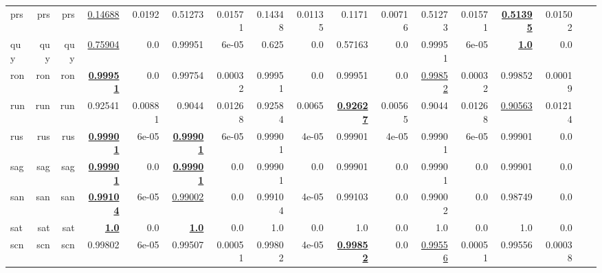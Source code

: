 \documentclass[11pt]{article}
\begin{document}
\begin{table*}[h]
{\begin{tabular}{lrrrrrrrrrrrrrrrr}
prs         & prs         & prs         & \underline{0.14688}         & 0.0192         & 0.51273         & 0.01571         & 0.14348         & 0.01135         & 0.1171         & 0.00716         & 0.51273         & 0.01571         & \textbf{\underline{0.51395}}         & 0.01502         \\
quy         & quy         & quy         & \underline{0.75904}         & 0.0         & 0.99951         & 6e-05         & 0.625         & 0.0         & 0.57163         & 0.0         & 0.99951         & 6e-05         & \textbf{\underline{1.0}}         & 0.0         \\
ron         & ron         & ron         & \textbf{\underline{0.99951}}         & 0.0         & 0.99754         & 0.00032         & 0.99951         & 0.0         & 0.99951         & 0.0         & \underline{0.99852}         & 0.00032         & 0.99852         & 0.00019         \\
run         & run         & run         & 0.92541         & 0.00881         & 0.9044         & 0.01268         & 0.92584         & 0.0065         & \textbf{\underline{0.92627}}         & 0.00565         & 0.9044         & 0.01268         & \underline{0.90563}         & 0.01214         \\
rus         & rus         & rus         & \textbf{\underline{0.99901}}         & 6e-05         & \textbf{\underline{0.99901}}         & 6e-05         & 0.99901         & 4e-05         & 0.99901         & 4e-05         & 0.99901         & 6e-05         & 0.99901         & 0.0         \\
sag         & sag         & sag         & \textbf{\underline{0.99901}}         & 0.0         & \textbf{\underline{0.99901}}         & 0.0         & 0.99901         & 0.0         & 0.99901         & 0.0         & 0.99901         & 0.0         & 0.99901         & 0.0         \\
san         & san         & san         & \textbf{\underline{0.99104}}         & 6e-05         & \underline{0.99002}         & 0.0         & 0.99104         & 4e-05         & 0.99103         & 0.0         & 0.99002         & 0.0         & 0.98749         & 0.0         \\
sat         & sat         & sat         & \textbf{\underline{1.0}}         & 0.0         & \textbf{\underline{1.0}}         & 0.0         & 1.0         & 0.0         & 1.0         & 0.0         & 1.0         & 0.0         & 1.0         & 0.0         \\
scn         & scn         & scn         & 0.99802         & 6e-05         & 0.99507         & 0.00051         & 0.99802         & 4e-05         & \textbf{\underline{0.99852}}         & 0.0         & \underline{0.99556}         & 0.00051         & 0.99556         & 0.00038         \\

\end{tabular}}
\end{table*}
\end{document}
